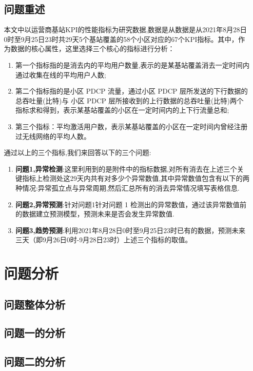 \documentclass{HighSchoolBigDataCompetition}
\begin{document}
	\subsection{问题重述}
	本文中以运营商基站KPI的性能指标为研究数据,数据是从数据是从2021年8月28日0时至9月25日23时共29天5个基站覆盖的58个小区对应的67个KPI指标。其中，作为数据的核心属性，这里选择三个核心的指标进行分析：
	\begin{enumerate}
		\item 第一个指标指的是消去内的平均用户数量,表示的是某基站覆盖消去一定时间内通过收集在线的平均用户人数;
		\item 第二个指标指的是小区 PDCP 流量，通过小区 PDCP 层所发送的下行数据的总吞吐量(比特)与 小区 PDCP 层所接收到的上行数据的总吞吐量(比特)两个指标求和得到，表示某基站覆盖的小区在一定时间内的上下行流量总和;
		\item 第三个指标：平均激活用户数，表示某基站覆盖的小区在一定时间内曾经注册过无线网络的平均人数。
	\end{enumerate}
	通过以上的三个指标,我们来回答以下的三个问题:
	\begin{enumerate}
		\item \textbf{问题1,异常检测}:这里利用到的是附件中的指标数据,对所有消去在上述三个关键指标上检测处这29天内共有对多少个异常数值,其中异常数值包含有以下的两种情况:异常孤立点与异常周期,然后汇总所有的消去异常情况填写表格信息.
		\item \textbf{问题2,异常预测}:针对问题1针对问题 1 检测出的异常数值，通过该异常数值前的数据建立预测模型，预测未来是否会发生异常数值.
		\item \textbf{问题3,趋势预测}:利用2021年8月28日0时至9月25日23时已有的数据，预测未来三天（即9月26日0时-9月28日23时）上述三个指标的取值。
	\end{enumerate}
	\section{问题分析}

	\subsection{问题整体分析}

	\subsection{问题一的分析}

	\subsection{问题二的分析}
\end{document}
